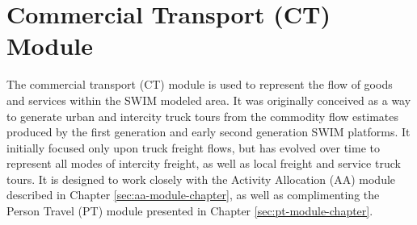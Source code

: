 \chapter {Commercial Transport (CT) Module}\label{sec:ct-module-chapter}

The commercial transport (CT) module is used to represent the flow of goods and services within the SWIM modeled area. It was originally conceived as a way to generate urban and intercity truck tours from the commodity flow estimates produced by the first generation and early second generation SWIM platforms. It initially focused only upon truck freight flows, but has evolved over time to represent all modes of intercity freight, as well as local freight and service truck tours. It is designed to work closely with the Activity Allocation (AA) module described in Chapter \ref{sec:aa-module-chapter}, as well as complimenting the Person Travel (PT) module presented in Chapter \ref{sec:pt-module-chapter}.

